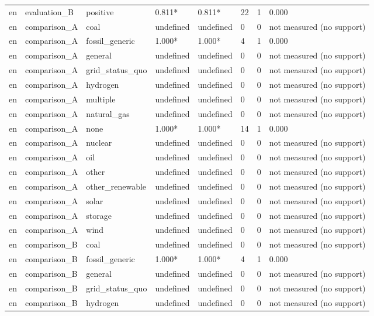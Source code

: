 \begin{table}[htbp]
\begin{tabular}{llllllll}
en & evaluation\_B & positive & 0.811* & 0.811* & 22 & 1 & 0.000 \\
en & comparison\_A & coal & undefined & undefined & 0 & 0 & not measured (no support) \\
en & comparison\_A & fossil\_generic & 1.000* & 1.000* & 4 & 1 & 0.000 \\
en & comparison\_A & general & undefined & undefined & 0 & 0 & not measured (no support) \\
en & comparison\_A & grid\_status\_quo & undefined & undefined & 0 & 0 & not measured (no support) \\
en & comparison\_A & hydrogen & undefined & undefined & 0 & 0 & not measured (no support) \\
en & comparison\_A & multiple & undefined & undefined & 0 & 0 & not measured (no support) \\
en & comparison\_A & natural\_gas & undefined & undefined & 0 & 0 & not measured (no support) \\
en & comparison\_A & none & 1.000* & 1.000* & 14 & 1 & 0.000 \\
en & comparison\_A & nuclear & undefined & undefined & 0 & 0 & not measured (no support) \\
en & comparison\_A & oil & undefined & undefined & 0 & 0 & not measured (no support) \\
en & comparison\_A & other & undefined & undefined & 0 & 0 & not measured (no support) \\
en & comparison\_A & other\_renewable & undefined & undefined & 0 & 0 & not measured (no support) \\
en & comparison\_A & solar & undefined & undefined & 0 & 0 & not measured (no support) \\
en & comparison\_A & storage & undefined & undefined & 0 & 0 & not measured (no support) \\
en & comparison\_A & wind & undefined & undefined & 0 & 0 & not measured (no support) \\
en & comparison\_B & coal & undefined & undefined & 0 & 0 & not measured (no support) \\
en & comparison\_B & fossil\_generic & 1.000* & 1.000* & 4 & 1 & 0.000 \\
en & comparison\_B & general & undefined & undefined & 0 & 0 & not measured (no support) \\
en & comparison\_B & grid\_status\_quo & undefined & undefined & 0 & 0 & not measured (no support) \\
en & comparison\_B & hydrogen & undefined & undefined & 0 & 0 & not measured (no support) \\

\end{tabular}
\end{table}
